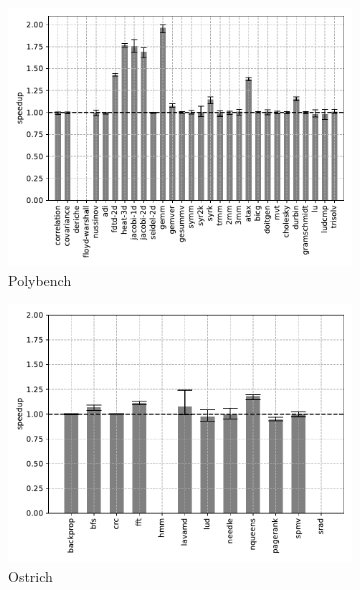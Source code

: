 \begin{figure}
    \centering
    \begin{subfigure}[t]{\textwidth}
        \includegraphics[width=\textwidth]{Images/6.3.RQ3/polybench-simd-speedup}
        \caption{Polybench}
    \end{subfigure}
    \begin{subfigure}[t]{.45\textwidth}
        \includegraphics[width=\textwidth]{Images/6.3.RQ3/ostrich-simd-speedup}
        \caption{Ostrich}
    \end{subfigure}
    \begin{subfigure}[t]{.45\textwidth}

\end{subfigure}
\end{figure}
